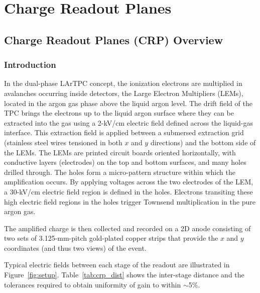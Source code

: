 \chapter{Charge Readout Planes}
\label{ch:fddp-CRP}

\section{Charge Readout Planes (CRP) Overview}
\label{sec:fddp-crp-ov}


\subsection{Introduction}
\label{sec:fddp-crp-intro}

In the dual-phase LArTPC concept, the ionization electrons are multiplied in avalanches 
occurring inside detectors, the Large Electron Multipliers (LEMs), located in the argon gas 
phase above the liquid argon level. The drift field of the TPC brings the electrons up to the liquid argon surface where they can  be   
extracted into the gas using a 2-kV/cm electric field defined across the liquid-gas interface.
This extraction field is applied between a submersed extraction
grid (stainless steel wires tensioned in both $x$ and $y$
directions) and the bottom side of the LEMs.
The LEMs are printed circuit boards oriented horizontally, with
conductive layers (electrodes) on the top and bottom surfaces, and many holes drilled
through. The holes form a micro-pattern structure within which the amplification occurs.  
By applying voltages across the two
electrodes of the LEM, a 30-kV/cm electric field region is defined in the holes\cite{Bondar:2008yw}.
Electrons transiting these high electric field regions in the holes trigger Townsend multiplication in the
pure argon gas.


The amplified charge is then collected and recorded on a 2D anode
consisting of two sets of 3.125-mm-pitch gold-plated copper strips that provide the $x$
and $y$ coordinates (and thus two views) of the event.

Typical electric fields between each stage of the readout are
illustrated in Figure~\ref{fig:setup}. Table~\ref{tab:crp_dist} shows
the inter-stage distance and the tolerances required to obtain
uniformity of gain to within $\sim$5\%.

